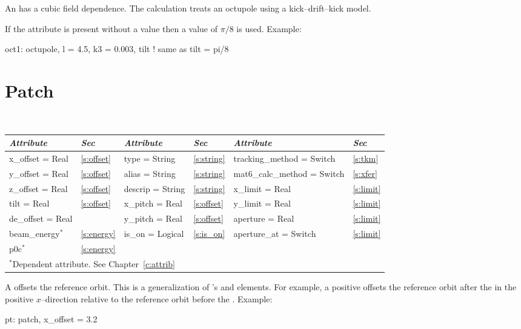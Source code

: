 {{An  has a cubic field dependence.
The  calculation treats an octupole using a kick--drift--kick model.

If the  attribute is present without a value then a value of 
$\pi/8$ is used.
Example:
\begin{example}
  oct1: octupole, l = 4.5, k3 = 0.003, tilt ! same as tilt = pi/8
\end{example}

\section{Patch}
\label{s:patch}

\begin{center}
\tt
\begin{tabular}{|l|l||l|l||l|l|} \hline
  {\sl Attribute} & {\sl Sec}  & {\sl Attribute} & {\sl Sec} & {\sl Attribute} & {\sl Sec} \\ \hline
  x\_offset  = Real  & \ref{s:offset} &  type = String      & \ref{s:string} & tracking\_method = Switch   & \ref{s:tkm}   \\ \hline
  y\_offset  = Real  & \ref{s:offset} &  alias = String     & \ref{s:string} & mat6\_calc\_method = Switch & \ref{s:xfer}  \\ \hline
  z\_offset  = Real  & \ref{s:offset} &  descrip = String   & \ref{s:string} & x\_limit = Real             & \ref{s:limit} \\ \hline
  tilt = Real        & \ref{s:offset} &  x\_pitch   = Real  & \ref{s:offset} & y\_limit = Real             & \ref{s:limit} \\ \hline
  de\_offset = Real  &                &  y\_pitch   = Real  & \ref{s:offset} & aperture = Real             & \ref{s:limit} \\ \hline
  beam\_energy$^*$   & \ref{s:energy} &  is\_on = Logical   & \ref{s:is_on}  & aperture\_at = Switch       & \ref{s:limit} \\ \hline
  p0c$^*$            & \ref{s:energy} &                     &                &                             &               \\ \hline
  \multicolumn{6}{l}{\small $^*$Dependent attribute. See Chapter~\ref{c:attrib}} \\
\end{tabular}
\end{center}
\toffset

A  offsets the reference orbit. This is a generalization of
\mad's  and  elements. For example, a positive
 offsets the reference orbit after the  in the
positive $x$--direction relative to the reference orbit before the
.
Example:
\begin{example}
  pt: patch, x\_offset = 3.2
\end{example}

}}
